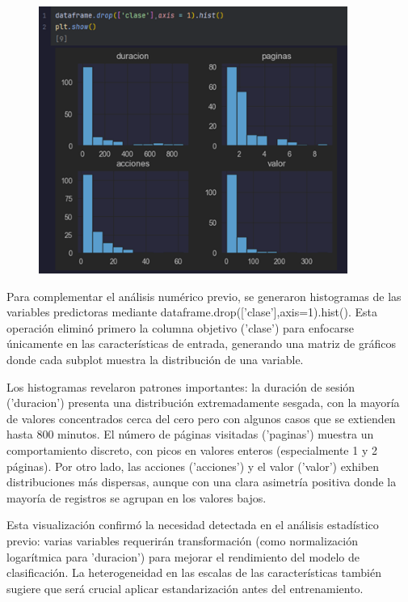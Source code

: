 \documentclass{article}
\begin{document}
\begin{figure}[H]
\centering
\includegraphics[width=0.9\textwidth]{Actividad-11/Imagen3.png}
\end{figure}

Para complementar el análisis numérico previo, se generaron histogramas de las variables predictoras mediante dataframe.drop(['clase'],axis=1).hist(). Esta operación eliminó primero la columna objetivo ('clase') para enfocarse únicamente en las características de entrada, generando una matriz de gráficos donde cada subplot muestra la distribución de una variable.

Los histogramas revelaron patrones importantes: la duración de sesión ('duracion') presenta una distribución extremadamente sesgada, con la mayoría de valores concentrados cerca del cero pero con algunos casos que se extienden hasta 800 minutos. El número de páginas visitadas ('paginas') muestra un comportamiento discreto, con picos en valores enteros (especialmente 1 y 2 páginas). Por otro lado, las acciones ('acciones') y el valor ('valor') exhiben distribuciones más dispersas, aunque con una clara asimetría positiva donde la mayoría de registros se agrupan en los valores bajos.

Esta visualización confirmó la necesidad detectada en el análisis estadístico previo: varias variables requerirán transformación (como normalización logarítmica para 'duracion') para mejorar el rendimiento del modelo de clasificación. La heterogeneidad en las escalas de las características también sugiere que será crucial aplicar estandarización antes del entrenamiento.
\end{document}
